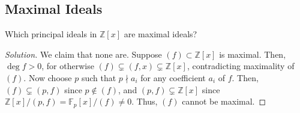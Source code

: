 \documentclass[12pt]{article}
\theoremstyle{remark}
\begin{document}
\subsection{Maximal Ideals}
\begin{problem}\label{exc:11.8.1}
  Which principal ideals in $\mathbb{Z}[x]$ are maximal ideals?
\end{problem}
\begin{proof}[Solution]
  We claim that none are. Suppose $(f) \subset \mathbb{Z}[x]$ is maximal. Then, $\deg f > 0$, for otherwise $(f) \subsetneq (f,x) \subsetneq \mathbb{Z}[x]$, contradicting maximality of $(f)$. Now choose $p$ such that $p \nmid a_i$ for any coefficient $a_i$ of $f$. Then, $(f) \subsetneq (p,f)$ since $p \notin (f)$, and $(p,f) \subsetneq \mathbb{Z}[x]$ since $\mathbb{Z}[x]/(p,f) = \mathbb{F}_p[x]/(f) \ne 0$. Thus, $(f)$ cannot be maximal.
\end{proof}
\end{document}
